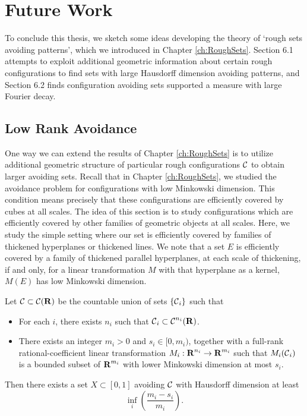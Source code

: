 
\chapter{Future Work}
\label{ch:Conclusions}

To conclude this thesis, we sketch some ideas developing the theory of `rough sets avoiding patterns', which we introduced in Chapter \ref{ch:RoughSets}. Section 6.1 attempts to exploit additional geometric information about certain rough configurations to find sets with large Hausdorff dimension avoiding patterns, and Section 6.2 finds configuration avoiding sets supported a measure with large Fourier decay.

\section{Low Rank Avoidance}

One way we can extend the results of Chapter \ref{ch:RoughSets} is to utilize additional geometric structure of particular rough configurations $\operatorname{\mathcal{C}}$ to obtain larger avoiding sets. Recall that in Chapter \ref{ch:RoughSets}, we studied the avoidance problem for configurations with low Minkowski dimension. This condition means precisely that these configurations are efficiently covered by cubes at all scales. The idea of this section is to study configurations which are efficiently covered by other families of geometric objects at all scales. Here, we study the simple setting where our set is efficiently covered by families of thickened hyperplanes or thickened lines. We note that a set $E$ is efficiently covered by a family of thickened parallel hyperplanes, at each scale of thickening, if and only, for a linear transformation $M$ with that hyperplane as a kernel, $M(E)$ has low Minkowski dimension.

\begin{theorem} \label{theorem9063909014901}
    Let $\operatorname{\mathcal{C}} \subset \operatorname{\mathcal{C}}(\operatorname{\mathbf{R}})$ be the countable union of sets $\{ \operatorname{\mathcal{C}}_i \}$ such that
    \begin{itemize}
        \item For each $i$, there exists $n_i$ such that $\operatorname{\mathcal{C}}_i \subset \operatorname{\mathcal{C}}^{n_i}(\operatorname{\mathbf{R}})$.

        \item There exists an integer $m_i > 0$ and $s_i \in [0,m_i)$, together with a full-rank rational-coefficient linear transformation $M_i: \operatorname{\mathbf{R}}^{n_i} \to \operatorname{\mathbf{R}}^{m_i}$ such that $M_i(\operatorname{\mathcal{C}}_i)$ is a bounded subset of $\operatorname{\mathbf{R}}^{m_i}$ with lower Minkowski dimension at most $s_i$.
    \end{itemize}
    Then there exists a set $X \subset [0,1]$ avoiding $\operatorname{\mathcal{C}}$ with Hausdorff dimension at least
    \[ \inf_i \left( \frac{m_i - s_i}{m_i} \right). \]
\end{theorem}

